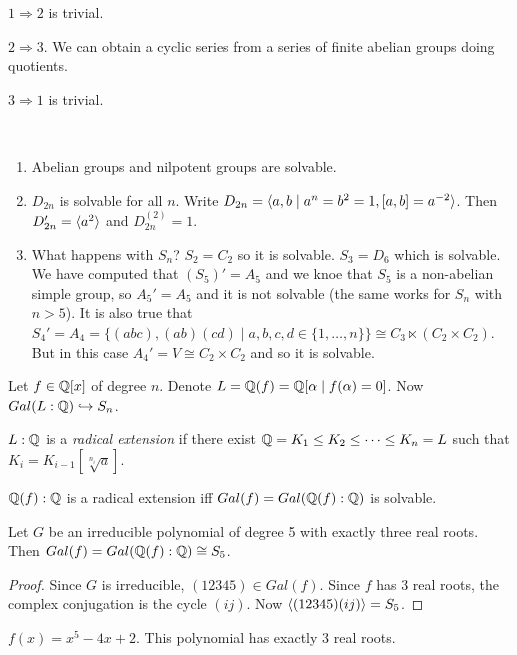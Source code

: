 \documentclass[twoside, 11pt]{article}
\begin{document}
\begin{dem}
$1\Rightarrow 2$ is trivial. 

$2\Rightarrow 3$. We can obtain a cyclic series from a series of finite abelian groups doing quotients.

$3\Rightarrow 1$ is trivial. 
\end{dem}

\begin{ej}\
\begin{enumerate}
\item Abelian groups and nilpotent groups are solvable.
\item $D_{2n}$ is solvable for all $n$. Write $D_{2n}=\langle{a,b\mid a^n=b^2=1, [a,b]=a^{-2}}\rangle$. Then $D_{2n}'=\langle{a^2}\rangle$ and $D_{2n}^{(2)}=1$.
\item What happens with $S_n$? $S_2=C_2$ so it is solvable. $S_3=D_6$ which is solvable. We have computed that $(S_5)'=A_5$ and we knoe that $S_5$ is a non-abelian simple group, so $A_5'=A_5$ and it is not solvable (the same works for $S_n$ with $n>5$). 
It is also true that $S_4'=A_4=\{(abc),(ab)(cd)\mid a,b,c,d\in\{1,\dots, n\}\}\cong C_3\ltimes (C_2\times C_2)$. But in this case $A_4'=V\cong C_2\times C_2$ and so it is solvable. 
\end{enumerate}
\end{ej}

Let $f\in\mathbb{Q}[x]$ of degree $n$. Denote $L=\mathbb{Q}(f)=\mathbb{Q}[\alpha\mid f(\alpha)=0]$. Now $Gal(L:\mathbb{Q})\hookrightarrow S_n$. 

\begin{defi}
$L:\mathbb{Q}$ is a \emph{radical extension} if there exist $\mathbb{Q}=K_1\leq K_2\leq\cdots\leq K_n=L$ such that $K_i=K_{i-1}[\sqrt[n_i]{a}]$. 
\end{defi}

\begin{teorema}
$\mathbb{Q}(f):\mathbb{Q}$ is a radical extension iff $Gal(f)=Gal(\mathbb{Q}(f):\mathbb{Q})$ is solvable. 
\end{teorema}


\begin{lemma}
Let $G$ be an irreducible polynomial of degree 5 with exactly three real roots. Then $Gal(f)=Gal(\mathbb{Q}(f):\mathbb{Q})\cong S_5$.
\end{lemma}
\begin{proof}
 Since $G$ is irreducible, $(12345)\in Gal(f)$. Since $f$ has 3 real roots, the complex conjugation is the cycle $(ij)$. Now $\langle{(12345)(ij)}\rangle=S_5$. 
\end{proof}

\begin{ej}
$f(x)=x^5-4x+2$. This polynomial has exactly 3 real roots. 
\end{ej}
\end{document}
